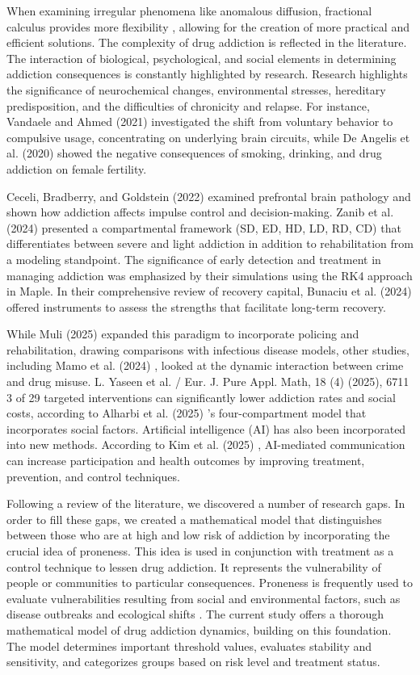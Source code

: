 \documentclass[10pt]{NSP1}
\begin{document}
When examining irregular phenomena like anomalous diffusion, fractional calculus provides more flexibility \cite{ref13, ref23}, allowing for the creation of more practical and efficient solutions. The complexity of drug addiction is reflected in the literature. The interaction of biological, psychological, and social elements in determining addiction consequences is constantly highlighted by research. Research highlights the significance of neurochemical changes, environmental stresses, hereditary predisposition, and the difficulties of chronicity and relapse. For instance, Vandaele and Ahmed (2021) investigated the shift from voluntary behavior to compulsive usage, concentrating on underlying brain circuits, while De Angelis et al. (2020) showed the negative consequences of smoking, drinking, and drug addiction on female fertility.

Ceceli, Bradberry, and Goldstein (2022) \cite{ref15} examined prefrontal brain pathology and shown how addiction affects impulse control and decision-making. Zanib et al. (2024) \cite{ref16} presented a compartmental framework (SD, ED, HD, LD, RD, CD) that differentiates between severe and light addiction in addition to rehabilitation from a modeling standpoint. The significance of early detection and treatment in managing addiction was emphasized by their simulations using the RK4 approach in Maple. In their comprehensive review of recovery capital, Bunaciu et al. (2024) \cite{ref17} offered instruments to assess the strengths that facilitate long-term recovery.

While Muli (2025) \cite{ref19} expanded this paradigm to incorporate policing and rehabilitation, drawing comparisons with infectious disease models, other studies, including Mamo et al. (2024) \cite{ref18}, looked at the dynamic interaction between crime and drug misuse. L. Yaseen et al. / Eur. J. Pure Appl. Math, 18 (4) (2025), 6711 3 of 29 targeted interventions can significantly lower addiction rates and social costs, according to Alharbi et al. (2025) \cite{ref20}'s four-compartment model that incorporates social factors. Artificial intelligence (AI) has also been incorporated into new methods. According to Kim et al. (2025) \cite{ref21}, AI-mediated communication can increase participation and health outcomes by improving treatment, prevention, and control techniques.

Following a review of the literature, we discovered a number of research gaps. In order to fill these gaps, we created a mathematical model that distinguishes between those who are at high and low risk of addiction by incorporating the crucial idea of proneness. This idea is used in conjunction with treatment as a control technique to lessen drug addiction. It represents the vulnerability of people or communities to particular consequences. Proneness is frequently used to evaluate vulnerabilities resulting from social and environmental factors, such as disease outbreaks and ecological shifts \cite{ref20, ref21, ref22, ref23, ref24, ref25}. The current study offers a thorough mathematical model of drug addiction dynamics, building on this foundation. The model determines important threshold values, evaluates stability and sensitivity, and categorizes groups based on risk level and treatment status.
\end{document}
